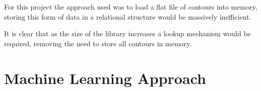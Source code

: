 For this project the approach used was to load a flat file of contours into memory, storing this form of data in a relational structure would be massively inefficient.

It is clear that as the size of the library increases a lookup mechanism would be required, removing the need to store all contours in memory.
\section{Machine Learning Approach}
